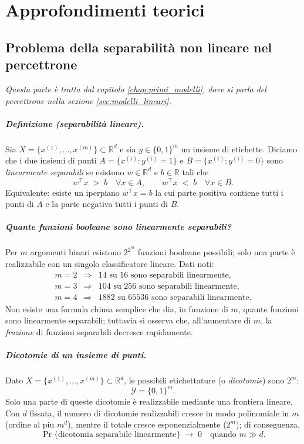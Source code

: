 \chapter{Approfondimenti teorici}\label{chap:approfondimenti_teorici}

\section{Problema della separabilità non lineare nel percettrone}\label{sec:separabilita_non_lineare}
\textit{Questa parte è tratta dal capitolo \ref{chap:primi_modelli}, dove si parla del percettrone nella sezione \ref{sec:modelli_lineari}.}

\paragraph{Definizione (separabilità lineare).}
Sia $X=\{x^{(1)},\ldots,x^{(m)}\}\subset\mathbb{R}^{d}$ e sia $y\in\{0,1\}^{m}$ un insieme di etichette.
Diciamo che i due insiemi di punti $A=\{x^{(i)}:y^{(i)}=1\}$ e $B=\{x^{(i)}:y^{(i)}=0\}$ sono \emph{linearmente separabili} se esistono $w\in\mathbb{R}^{d}$ e $b\in\mathbb{R}$ tali che
\[
w^\top x \;>\; b \quad \forall x\in A,
\qquad
w^\top x \;<\; b \quad \forall x\in B.
\]
Equivalente: esiste un iperpiano $w^\top x=b$ la cui parte positiva contiene tutti i punti di $A$ e la parte negativa tutti i punti di $B$.

\paragraph{Quante funzioni booleane sono linearmente separabili?}
Per $m$ argomenti binari esistono $2^{2^{m}}$ funzioni booleane possibili; solo una parte è realizzabile con un singolo classificatore lineare.
Dati noti:
\[
\begin{array}{lcl}
m=2 &\Rightarrow& 14 \text{ su } 16 \text{ sono separabili linearmente},\\[2pt]
m=3 &\Rightarrow& 104 \text{ su } 256 \text{ sono separabili linearmente},\\[2pt]
m=4 &\Rightarrow& 1882 \text{ su } 65536 \text{ sono separabili linearmente}.
\end{array}
\]
Non esiste una formula chiusa semplice che dia, in funzione di $m$, quante funzioni sono linearmente separabili; tuttavia si osserva che, all’aumentare di $m$, la \emph{frazione} di funzioni separabili decresce rapidamente.

\paragraph{Dicotomie di un insieme di punti.}
Dato $X=\{x^{(1)},\ldots,x^{(m)}\}\subset\mathbb{R}^{d}$, le possibili etichettature (o \emph{dicotomie}) sono $2^{m}$:
\[
\mathcal{Y}=\{0,1\}^{m} .
\]
Solo una parte di queste dicotomie è realizzabile mediante una frontiera lineare. Con $d$ fissata, il numero di dicotomie realizzabili cresce in modo polinomiale in $m$ (ordine al piu $m^{d}$), mentre il totale cresce esponenzialmente ($2^{m}$); di conseguenza,
\[
\Pr\{\text{dicotomia separabile linearmente}\}\;\longrightarrow\;0
\quad\text{quando } m \gg d .
\]

